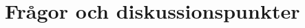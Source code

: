 \documentclass[../report.tex]{subfiles}
\begin{document}
    \chapter{Frågor och diskussionspunkter}
\end{document}
